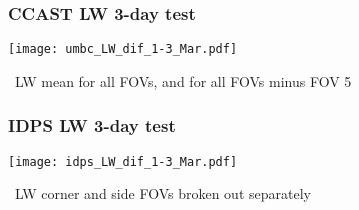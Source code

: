 \begin{frame}
\frametitle{CCAST LW 3-day test}

\begin{center}
  \texttt{[image: umbc\_LW\_dif\_1-3\_Mar.pdf]}
\end{center}

\ccast\ LW mean for all FOVs, and for all FOVs minus FOV 5

\end{frame}
\begin{frame}
\frametitle{IDPS LW 3-day test}

\begin{center}
  \texttt{[image: idps\_LW\_dif\_1-3\_Mar.pdf]}
\end{center}

\ccast\ LW corner and side FOVs broken out separately

\end{frame}
